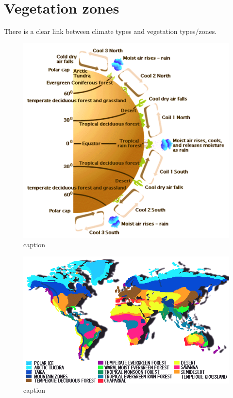 \documentclass[12pt,oneside]{book}
\begin{document}
\section{Vegetation zones}\label{vegetation-zones}

There is a clear link between climate types and vegetation types/zones.

\begin{figure}

{\centering \includegraphics[width=0.8\linewidth]{figures/Figure86} 

}

\caption{caption}\label{fig:Vegetationzones}
\end{figure}

\begin{figure}

{\centering \includegraphics[width=0.8\linewidth]{figures/Figure87} 

}

\caption{caption}\label{fig:Vegetationzones2}
\end{figure}
\end{document}
